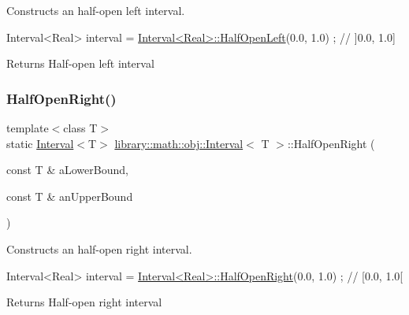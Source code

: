 Constructs an half-\/open left interval. 


\begin{DoxyCode}
Interval<Real> interval = \hyperlink{classlibrary_1_1math_1_1obj_1_1_interval_a7e706c1e5133c731645e7633a9d763bd}{Interval<Real>::HalfOpenLeft}(0.0, 1.0) ; \textcolor{comment}{// ]0.0,
       1.0]}
\end{DoxyCode}


\begin{DoxyReturn}{Returns}
Half-\/open left interval 
\end{DoxyReturn}
\mbox{\label{classlibrary_1_1math_1_1obj_1_1_interval_a1a15d0518cc69fa3e442fc39c0622477}} 
\subsubsection{\texorpdfstring{Half\+Open\+Right()}{HalfOpenRight()}}
{\footnotesize\ttfamily template$<$class T$>$ \\
static \hyperlink{classlibrary_1_1math_1_1obj_1_1_interval}{Interval}$<$T$>$ \hyperlink{classlibrary_1_1math_1_1obj_1_1_interval}{library\+::math\+::obj\+::\+Interval}$<$ T $>$\+::Half\+Open\+Right (\begin{DoxyParamCaption}\item[{const T \&}]{a\+Lower\+Bound,  }\item[{const T \&}]{an\+Upper\+Bound }\end{DoxyParamCaption})\hspace{0.3cm}{\ttfamily [static]}}



Constructs an half-\/open right interval. 


\begin{DoxyCode}
Interval<Real> interval = \hyperlink{classlibrary_1_1math_1_1obj_1_1_interval_a1a15d0518cc69fa3e442fc39c0622477}{Interval<Real>::HalfOpenRight}(0.0, 1.0) ; \textcolor{comment}{// [0.0,
       1.0[}
\end{DoxyCode}


\begin{DoxyReturn}{Returns}
Half-\/open right interval 
\end{DoxyReturn}
\mbox{\label{classlibrary_1_1math_1_1obj_1_1_interval_a2de37bb9d7b97ae7892188c26c99b6fb}} 
